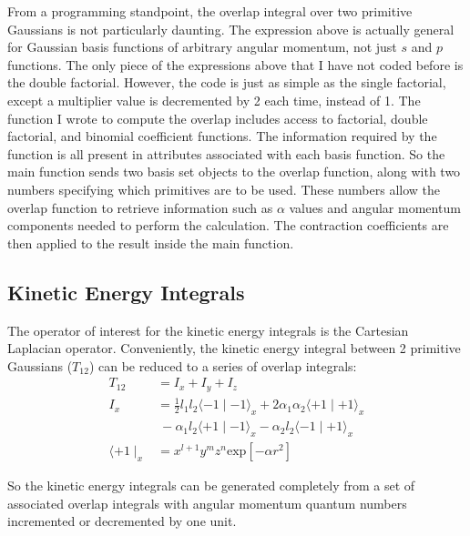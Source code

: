 \documentclass[12pt]{article}
\begin{document}
From a programming standpoint, the overlap integral over two primitive Gaussians is not
particularly daunting. The expression above is actually general for Gaussian basis 
functions of arbitrary angular momentum, not just $s$ and $p$ functions. The only piece
of the expressions above that I have not coded before is the double factorial. However,
the code is just as simple as the single factorial, except a multiplier value is decremented by
2 each time, instead of 1. The function I wrote to compute the overlap includes access
to factorial, double factorial, and binomial coefficient functions. 
The information required by the function is
all present in attributes associated with each basis function. So the main function sends
two basis set objects to the overlap function, along with two numbers specifying which 
primitives are to be used. These numbers allow the overlap function to retrieve information
such as $\alpha$ values and angular momentum components needed to perform
the calculation. The contraction coefficients are then applied to the result inside the main
function.

\subsection{Kinetic Energy Integrals}
The operator of interest for the kinetic energy integrals is the Cartesian Laplacian
operator.
Conveniently, the kinetic energy integral between 2 primitive Gaussians ($T_{12}$)
can be reduced to a series of overlap integrals:
\begin{align*}
T_{12}&=I_x + I_y + I_z \\
I_x &= \frac{1}{2}l_1l_2\langle-1\mid -1\rangle_x
      + 2\alpha_1\alpha_2\langle+1\mid+1\rangle_x \\
      & \ - \alpha_1 l_2 \langle +1\mid -1 \rangle_x - \alpha_2 l_2 \langle-1\mid+1\rangle_x \\
 \langle +1\mid_x &= x^{l+1}y^m z^n \mathrm{exp} [-\alpha r^2]
\end{align*}

So the kinetic energy integrals can be generated completely from a set of 
associated overlap integrals with angular momentum quantum numbers incremented
or decremented by one unit.
\end{document}
